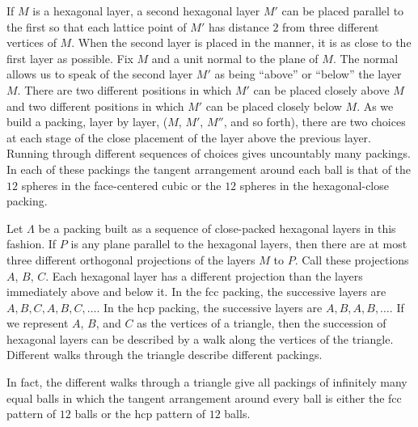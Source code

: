If $M$ is a hexagonal layer, a second hexagonal layer $M'$ can be
placed parallel to the first so that each lattice point of $M'$ has
distance $2$ from three different vertices of $M$.  When the second
layer is placed in the manner, it is as close to the first layer as
possible. Fix $M$ and a unit normal to the plane of $M$. The normal
allows us to speak of the second layer $M'$ as being ``above'' or
``below'' the layer $M$. There are two different positions in which
$M'$ can be placed closely above $M$ and two different positions in
which $M'$ can be placed closely below $M$. As we build a packing,
layer by layer, ($M$, $M'$, $M''$, and so forth), there are two
choices at each stage of the close placement of the layer above the
previous layer. Running through different sequences of choices gives
uncountably many packings.  In each of these packings the tangent
arrangement around each ball is that of the $12$ spheres in the
face-centered cubic or the $12$ spheres in the hexagonal-close
packing.

Let $\Lambda$ be a packing built as a sequence of close-packed
hexagonal layers in this fashion.  If $P$ is any plane parallel to
the hexagonal layers, then there are at most three different
orthogonal projections of the layers $M$ to $P$.  Call these
projections $A$, $B$, $C$.  Each hexagonal layer has a different
projection than the layers immediately above and below it.  In the
fcc packing, the successive layers are $A,B,C,A,B,C,\ldots$.  In
the hcp packing, the successive layers are $A,B,A,B,\ldots$.  If
we represent $A$, $B$, and $C$ as the vertices of a triangle, then
the succession of hexagonal layers can be described by a walk
along the vertices of the triangle. Different walks through the
triangle describe different packings.


In fact, the different walks through a triangle give all packings
of infinitely many equal balls in which the tangent arrangement
around every ball is either the fcc pattern of $12$ balls or the
hcp pattern of $12$ balls.

\bigskip


